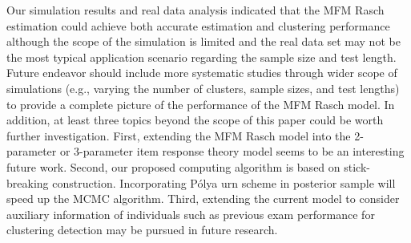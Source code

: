 \documentclass[12pt]{article}
\begin{document}
Our simulation results and real data analysis indicated that the MFM Rasch estimation could achieve both accurate estimation and clustering performance although the scope of the simulation is limited and the real data set may not be the most typical application scenario regarding the sample size and test length. Future endeavor should include more systematic studies through wider scope of simulations (e.g., varying the number of clusters, sample sizes, and test lengths) to provide a complete picture of the performance of the MFM Rasch model. In addition, %
at least three topics beyond the scope of this paper could be worth further investigation. First, extending the MFM Rasch model into the 2-parameter or 3-parameter item response theory model seems to be an  interesting future work. Second, our proposed computing algorithm is based on stick-breaking construction. Incorporating  P\'{o}lya urn scheme in posterior sample \citep{neal2000markov} will speed up the MCMC algorithm. Third, extending the current model to consider auxiliary information of individuals such as previous exam performance for clustering detection may be pursued in future research. 

%
%




%

\end{document}
